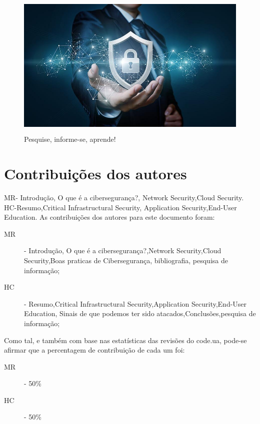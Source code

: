 \documentclass{report}
\begin{document}
{\begin{figure}[hp]
    \center 
    \includegraphics[height=200pt]{ciberseguranca-2.jpeg}
    \caption{Pesquise, informe-se, aprende!}
    \label{fig:Figura4logo.1}
\end{figure}


\chapter*{Contribuições dos autores}
MR- Introdução, O que é a cibersegurança?, Network Security,Cloud Security.
HC-Resumo,Critical Infrastructural Security, Application Security,End-User Education.
As contribuições dos autores para este documento foram:

\begin{description}
	\item[\ac{MR}] - Introdução, O que é a cibersegurança?,Network Security,Cloud Security,Boas praticas de Cibersegurança, bibliografia, pesquisa de informação;
	\item[\ac{HC}] - Resumo,Critical Infrastructural Security,Application Security,End-User Education, Sinais de que podemos ter sido atacados,Conclusões,pesquisa de informação;
\end{description}

Como tal, e também com base nas estatísticas das revisões do code.ua, pode-se afirmar que a percentagem de contribuição de cada um foi:

\begin{description}
	\item[\ac{MR}] - 50\%
	\item[\ac{HC}] - 50\%
\end{description}

}
\end{document}
